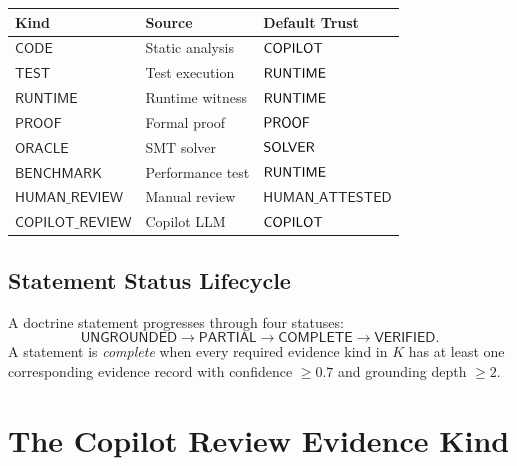 \documentclass[11pt]{article}
\newcommand{\CopRev}{\mathsf{COPILOT\_REVIEW}}
\begin{document}
\begin{center}
\begin{tabular}{lll}
\toprule
\textbf{Kind} & \textbf{Source} & \textbf{Default Trust} \\
\midrule
$\mathsf{CODE}$          & Static analysis      & $\mathsf{COPILOT}$ \\
$\mathsf{TEST}$          & Test execution        & $\mathsf{RUNTIME}$ \\
$\mathsf{RUNTIME}$       & Runtime witness       & $\mathsf{RUNTIME}$ \\
$\mathsf{PROOF}$         & Formal proof          & $\mathsf{PROOF}$ \\
$\mathsf{ORACLE}$        & SMT solver            & $\mathsf{SOLVER}$ \\
$\mathsf{BENCHMARK}$     & Performance test      & $\mathsf{RUNTIME}$ \\
$\mathsf{HUMAN\_REVIEW}$ & Manual review         & $\mathsf{HUMAN\_ATTESTED}$ \\
$\CopRev$                & Copilot LLM           & $\mathsf{COPILOT}$ \\
\bottomrule
\end{tabular}
\end{center}

\subsection{Statement Status Lifecycle}

\begin{definition}\label{def:status}
A doctrine statement progresses through four statuses:
\[
  \mathsf{UNGROUNDED} \to \mathsf{PARTIAL} \to \mathsf{COMPLETE} \to
  \mathsf{VERIFIED}.
\]
A statement is \emph{complete} when every required evidence kind in $K$ has
at least one corresponding evidence record with confidence $\geq 0.7$ and
grounding depth $\geq 2$.
\end{definition}

\section{The Copilot Review Evidence Kind}\label{sec:copilot-review}
\end{document}
